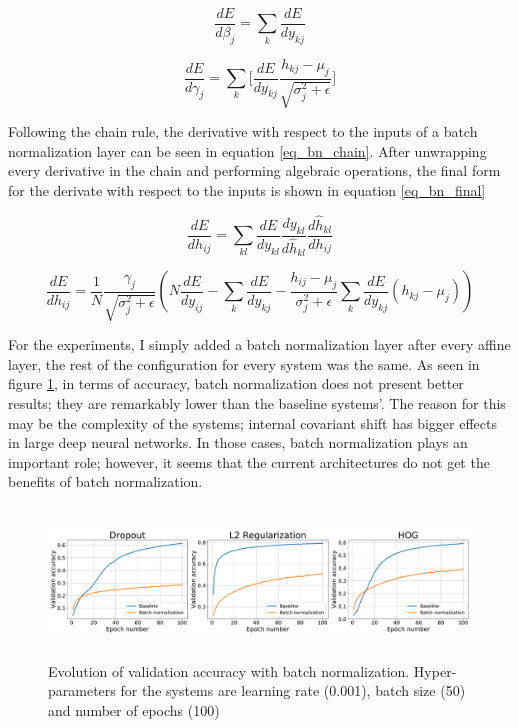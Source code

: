 \documentclass{article}
\begin{document}
\begin{equation}
	\frac{dE}{d\beta_j} = \sum_k 	\frac{dE}{dy_{kj}}
	\label{eq_bn_gwrt_gamma}
\end{equation}

\begin{equation}
	\frac{dE}{d\gamma_j} = \sum_k \lbrack \frac{dE}{dy_{kj}} \frac{h_{kj} - \mu_j}{\sqrt{\sigma_j^2 + \epsilon}} \rbrack
	\label{eq_bn_gwrt_beta}
\end{equation}

Following the chain rule, the derivative with respect to the inputs of a batch normalization layer can be seen in equation \ref{eq_bn_chain}. After unwrapping every derivative in the chain and performing algebraic operations, the final form for the derivate with respect to the inputs is shown in equation \ref{eq_bn_final}

\begin{equation}
	\frac{dE}{dh_{ij}} = \sum_{kl} \frac{dE}{dy_{kl}} \frac{dy_{kl}}{d\hat{h}_{kl}} \frac{d\hat{h}_{kl}}{dh_{ij}}
	\label{eq_bn_chain}
\end{equation}

\begin{equation}
	\frac{dE}{dh_{ij}} = \frac{1}{N} \frac{\gamma_j}{\sqrt{\sigma_j^2 + \epsilon}} (N \frac{dE}{dy_{ij}} - \sum_k \frac{dE}{dy_{kj}} - \frac{h_{ij} - \mu_j}{\sigma_j^2 + \epsilon} \sum_k \frac{dE}{dy_{kj}} (h_{kj} - \mu_j))
	\label{eq_bn_final}
\end{equation}

For the experiments, I simply added a batch normalization layer after every affine layer, the rest of the configuration for every system was the same. As seen in figure \ref{fig:fg_bn}, in terms of accuracy, batch normalization does not present better results; they are remarkably lower than the baseline systems'. The reason for this may be the complexity of the systems; internal covariant shift has bigger effects in large deep neural networks. In those cases, batch normalization plays an important role; however, it seems that the current architectures do not get the benefits of batch normalization.

\begin{figure}[tb]
\vskip 5mm
\begin{center}
\includegraphics[width=\textwidth,height=4cm]{exp3_metrics}
\caption{Evolution of validation accuracy with batch normalization. Hyper-parameters for the systems are learning rate (0.001), batch size (50) and number of epochs (100)}
\label{fig:fg_bn}
\end{center}
\vskip -5mm
\end{figure}
\end{document}
